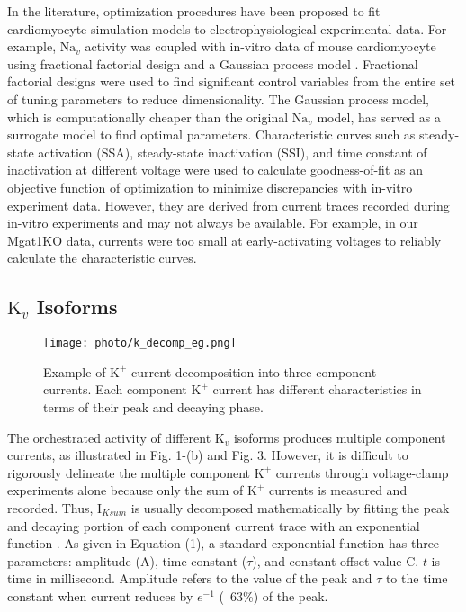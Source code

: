 \documentclass[journal]{IEEEtran}
\begin{document}
In the literature, optimization procedures have been proposed to fit cardiomyocyte simulation models to electrophysiological experimental data. For example, $\text{Na}_{v}$ activity was coupled with in-vitro data of mouse cardiomyocyte using fractional factorial design and a Gaussian process model \cite{du2015statistical}. Fractional factorial designs were used to find significant control variables from the entire set of tuning parameters to reduce dimensionality. The Gaussian process model, which is computationally cheaper than the original $\text{Na}_{v}$ model, has served as a surrogate model to find optimal parameters. Characteristic curves such as steady-state activation (SSA), steady-state inactivation (SSI), and time constant of inactivation at different voltage were used to calculate goodness-of-fit as an objective function of optimization to minimize discrepancies with in-vitro experiment data. However, they are derived from current traces recorded during in-vitro experiments and may not always be available. For example, in our Mgat1KO data, currents were too small at early-activating voltages to reliably calculate the characteristic curves.  

\subsection{$\text{K}_{v}$ Isoforms}
\begin{figure}
    \label{fig3}
    \centering
    \texttt{[image: photo/k\_decomp\_eg.png]}
    \caption{Example of $\text{K}^{+}$ current decomposition into three component currents. Each component $\text{K}^{+}$ current has different characteristics in terms of their peak and decaying phase.}
\end{figure}
The orchestrated activity of different $\text{K}_{v}$ isoforms produces multiple component currents, as illustrated in Fig. 1-(b) and Fig. 3. However, it is difficult to rigorously delineate the multiple component $\text{K}^{+}$ currents through voltage-clamp experiments alone because only the sum of $\text{K}^{+}$ currents is measured and recorded. Thus, $\text{I}_{Ksum}$ is usually decomposed mathematically by fitting the peak and decaying portion of each component current trace with an exponential function \cite{brunet2004heterogeneous}. As given in Equation (1), a standard exponential function has three parameters: amplitude ($\text{A}$), time constant ($\tau$), and constant offset value $\text{C}$. $t$ is time in millisecond. Amplitude refers to the value of the peak and $\tau$ to the time constant when current reduces by $e^{-1}$ (~63\%) of the peak. 
\end{document}
